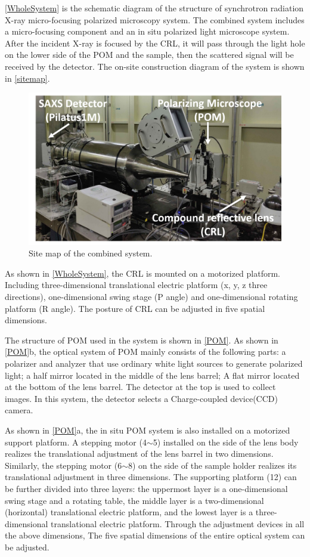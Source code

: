\documentclass{Head}
\begin{document}
\autoref{WholeSystem} is the schematic diagram of the structure of synchrotron radiation X-ray micro-focusing polarized microscopy system.
The combined system includes a micro-focusing component and an in situ polarized light microscope system.
After the incident X-ray is focused by the CRL, it will pass through the light hole on the lower side of the POM and the sample, then the scattered signal will be received by the detector.
The on-site construction diagram of the system is shown in \autoref{sitemap}.
\begin{figure}
    \centering
    \includegraphics[scale=0.5]{Figures/Fig4SiteMap.png}
    \caption{Site map of the combined system.}
    \label{sitemap}
\end{figure}

As shown in \autoref{WholeSystem}, the CRL is mounted on a motorized platform. Including three-dimensional translational electric platform (x, y, z three directions), one-dimensional swing stage (P angle) and one-dimensional rotating platform (R angle). The posture of CRL can be adjusted in five spatial dimensions.


The structure of POM used in the system is shown in \autoref{POM}.
As shown in \autoref{POM}b, the optical system of POM mainly consists of the following parts: a polarizer and analyzer that use ordinary white light sources to generate polarized light; a half mirror located in the middle of the lens barrel; A flat mirror located at the bottom of the lens barrel. The detector at the top is used to collect images. In this system, the detector selects a Charge-coupled device(CCD) camera.


As shown in \autoref{POM}a, the in situ POM system is also installed on a motorized support platform.
A stepping motor (4$\sim$5) installed on the side of the lens body realizes the translational adjustment of the lens barrel in two dimensions.
Similarly, the stepping motor (6$\sim$8) on the side of the sample holder realizes its translational adjustment in three dimensions.
The supporting platform (12) can be further divided into three layers: the uppermost layer is a one-dimensional swing stage and a rotating table, the middle layer is a two-dimensional (horizontal) translational electric platform, and the lowest layer is a three-dimensional translational electric platform.
Through the adjustment devices in all the above dimensions, The five spatial dimensions of the entire optical system can be adjusted.
\end{document}
